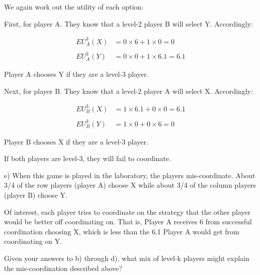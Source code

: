 \documentclass[
  letterpaper,
  DIV=11,
  numbers=noendperiod]{scrreprt}
\begin{document}
\begin{tcolorbox}[enhanced jigsaw, title=\textcolor{quarto-callout-tip-color}{\faLightbulb}\hspace{0.5em}{Answer}, toprule=.15mm, colback=white, breakable, titlerule=0mm, colframe=quarto-callout-tip-color-frame, coltitle=black, opacityback=0, rightrule=.15mm, colbacktitle=quarto-callout-tip-color!10!white, bottomtitle=1mm, opacitybacktitle=0.6, arc=.35mm, bottomrule=.15mm, toptitle=1mm, leftrule=.75mm, left=2mm]

We again work out the utility of each option:

First, for player A. They know that a level-2 player B will select Y.
Accordingly:

\begin{align*}
EU ^{3}_{A}(X)&= 0\times 6+1\times 0=0 \\
\\
EU ^{3}_{A}(Y)&= 0\times 0+1\times 6.1=6.1
\end{align*}

Player A chooses Y if they are a level-3 player.

Next, for player B. They know that a level-2 player A will select X.
Accordingly:

\begin{align*}
EU ^{3}_{B}(X)&= 1\times 6.1+0\times 0=6.1 \\
\\
EU ^{3}_{B}(Y)&= 1\times 0+0\times 6=0
\end{align*}

Player B chooses X if they are a level-3 player.

If both players are level-3, they will fail to coordinate.

\end{tcolorbox}

e) When this game is played in the laboratory, the players
mis-coordinate. About 3/4 of the row players (player A) choose X while
about 3/4 of the column players (player B) choose Y.

Of interest, each player tries to coordinate on the strategy that the
other player would be better off coordinating on. That is, Player A
receives 6 from successful coordination choosing X, which is less than
the 6.1 Player A would get from coordinating on Y.

Given your answers to b) through d), what mix of level-k players might
explain the mis-coordination described above?
\end{document}
